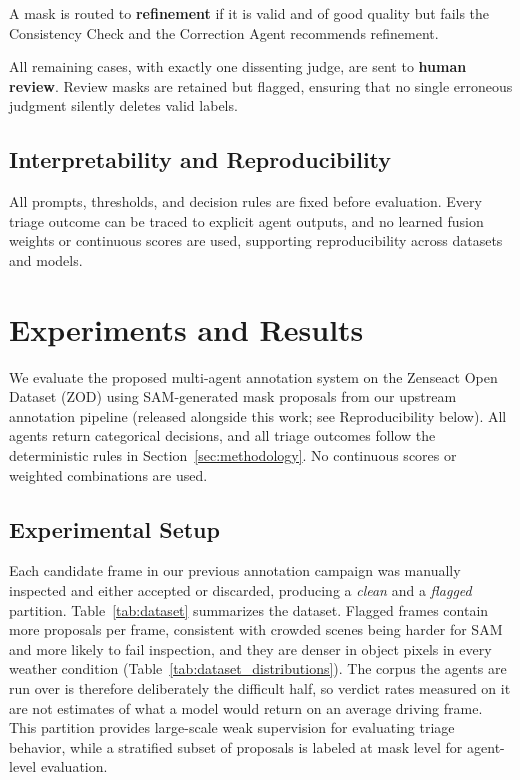 \documentclass[conference]{IEEEtran}
\begin{document}
A mask is routed to \textbf{refinement} if it is valid and of good quality but fails the Consistency Check and the Correction Agent recommends refinement.

All remaining cases, with exactly one dissenting judge, are sent to \textbf{human review}. 
Review masks are retained but flagged, ensuring that no single erroneous judgment silently deletes valid labels.

\subsection{Interpretability and Reproducibility}

All prompts, thresholds, and decision rules are fixed before evaluation. 
Every triage outcome can be traced to explicit agent outputs, and no learned fusion weights or continuous scores are used, supporting reproducibility across datasets and models.

\section{Experiments and Results}
\label{sec:experiments}

We evaluate the proposed multi-agent annotation system on the Zenseact Open Dataset (ZOD) \cite{alibeigi2023zod} using SAM-generated mask proposals from our upstream annotation pipeline (released alongside this work; see Reproducibility below).
All agents return categorical decisions, and all triage outcomes follow the deterministic rules in Section~\ref{sec:methodology}. 
No continuous scores or weighted combinations are used.

\subsection{Experimental Setup}

Each candidate frame in our previous annotation campaign was manually inspected and either accepted or discarded, producing a \emph{clean} and a \emph{flagged} partition. 
Table~\ref{tab:dataset} summarizes the dataset. 
Flagged frames contain more proposals per frame, consistent with crowded scenes being harder for SAM and more likely to fail inspection, and they are denser in object pixels in every weather condition (Table~\ref{tab:dataset_distributions}).
The corpus the agents are run over is therefore deliberately the difficult half, so verdict rates measured on it are not estimates of what a model would return on an average driving frame.
This partition provides large-scale weak supervision for evaluating triage behavior, while a stratified subset of proposals is labeled at mask level for agent-level evaluation.
\end{document}
